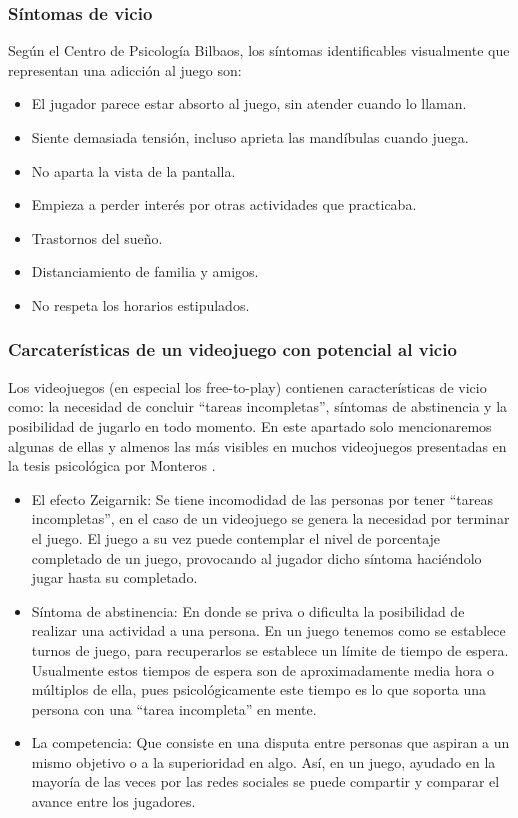 \subsubsection{Síntomas de vicio}
Según el Centro de Psicología Bilbaos\cite{centrodepsicologiabilbaos.l.p.},
los síntomas identificables visualmente que representan una adicción al juego son:
\begin{itemize}
	\item El jugador parece estar absorto al juego, sin atender cuando lo llaman.
	\item Siente demasiada tensión, incluso aprieta las mandíbulas cuando juega.
	\item No aparta la vista de la pantalla.
	\item Empieza a perder interés por otras actividades que practicaba.
	\item Trastornos del sueño.
	\item Distanciamiento de familia y amigos.
	\item No respeta los horarios estipulados.
\end{itemize}

\subsubsection{Carcaterísticas de un videojuego con potencial al vicio}
Los videojuegos (en especial los free-to-play) contienen características de vicio como: la necesidad de concluir “tareas incompletas”, síntomas de abstinencia y la posibilidad de jugarlo en todo momento. En este apartado solo mencionaremos algunas de ellas y almenos las más visibles en muchos videojuegos presentadas en la tesis psicológica por Monteros \cite{montero2014ocios}.

 \begin{itemize}
 	\item El efecto Zeigarnik: Se tiene incomodidad de las personas por tener “tareas incompletas”, en el caso de un videojuego se genera la necesidad por terminar el juego. El juego a su vez puede contemplar el nivel de porcentaje completado de un juego, provocando al jugador dicho síntoma haciéndolo jugar hasta su completado.
 	
 	\item Síntoma de abstinencia: En donde se priva o dificulta la posibilidad de realizar una actividad a una persona. En un juego tenemos como se establece turnos de juego, para recuperarlos se establece un límite de tiempo de espera. Usualmente estos tiempos de espera son de aproximadamente media hora o múltiplos de ella, pues psicológicamente este tiempo es lo que soporta una persona con una “tarea incompleta” en mente.
 	
 	\item La competencia: Que consiste en una disputa entre personas que aspiran a un mismo objetivo o a la superioridad en algo. Así, en un juego, ayudado en la mayoría de las veces por las redes sociales se puede compartir y comparar el avance entre los jugadores.
 	 \\[1pt]
 	
 \end{itemize}

